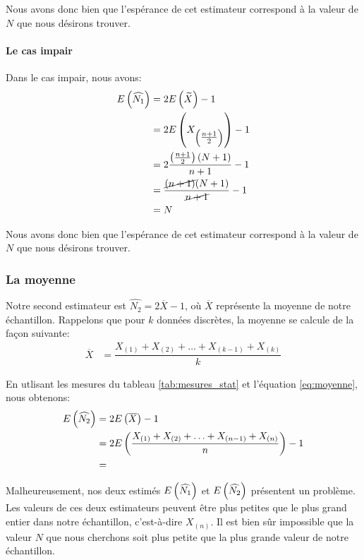 \documentclass[10pt]{article}
\begin{document}
Nous avons donc bien que l'espérance de cet estimateur correspond à la
valeur de \(N\) que nous désirons trouver.

\hypertarget{le-cas-impair}{%
\paragraph{Le cas impair}\label{le-cas-impair}}

Dans le cas impair, nous avons: \begin{align*}
E\left(\widehat{N_1}\right) &= 2E\left(\widetilde{X}\right)-1 \\
&= 2E\left(X_{\left(\tfrac{n+1}{2}\right)} \right)-1 \\
&= 2\dfrac{\left(\tfrac{n+1}{2}\right)(N+1)}{n+1}-1 \\
&= \dfrac{\cancel{(n+1)}(N+1)}{\cancel{n+1}}-1 \\
&= N
\end{align*}

Nous avons donc bien que l'espérance de cet estimateur correspond à la
valeur de \(N\) que nous désirons trouver.

\hypertarget{la-moyenne}{%
\subsubsection{La moyenne}\label{la-moyenne}}

Notre second estimateur est \(\widehat{N_2}=2\overline{X}-1\), où
\(\overline{X}\) représente la moyenne de notre échantillon. Rappelons
que pour \(k\) données discrètes, la moyenne se calcule de la façon
suivante: \begin{align}
\overline{X} &= \dfrac{X_{(1)}+X_{(2)}+\ldots +X_{(k-1)}+X_{(k)}}{k}
\label{eq:moyenne}
\end{align}

En utlisant les mesures du tableau \ref{tab:mesures_stat} et l'équation
\ref{eq:moyenne}, nous obtenons: \begin{align*}
E\left(\widehat{N_2}\right) &= 2E\left(\overline{X}\right)-1 \\
&= 2E\left(\dfrac{X_{(1)}+X_{(2)}+\ldots +X_{(n-1)}+X_{(n)}}{n}\right)-1 \\
&= 
\end{align*}

Malheureusement, nos deux estimés \(E\left(\widehat{N_1}\right)\) et
\(E\left(\widehat{N_2}\right)\) présentent un problème. Les valeurs de ces deux
estimateurs peuvent être plus petites que le plus grand entier dans
notre échantillon, c'est-à-dire \(X_{(n)}\). Il est bien sûr impossible
que la valeur \(N\) que nous cherchons soit plus petite que la plus
grande valeur de notre échantillon.
\end{document}

